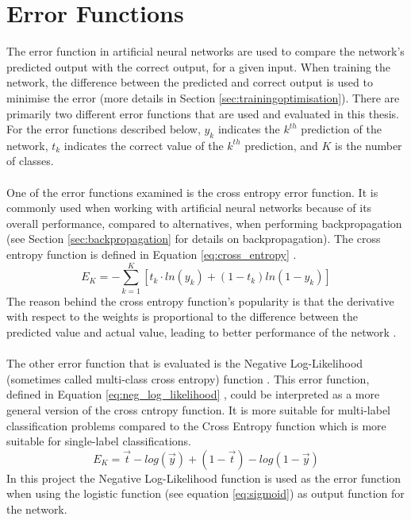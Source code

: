 \section{Error Functions} \label{errorfunction}
The error function in artificial neural networks are used to compare the network's predicted output with the correct output, for a given input. When training the network, the difference between the predicted and correct output is used to minimise the error (more details in Section \ref{sec:trainingoptimisation}). There are primarily two different error functions that are used and evaluated in this thesis. For the error functions described below, $y_k$ indicates the $k^{th}$ prediction of the network, $t_k$ indicates the correct value of the $k^{th}$ prediction, and $K$ is the number of classes.
\\\\
One of the error functions examined is the cross entropy error function. It is commonly used when working with artificial neural networks because of its overall performance, compared to alternatives, when performing backpropagation (see Section \ref{sec:backpropagation} for details on backpropagation). The cross entropy function is defined in Equation \ref{eq:cross_entropy} \parencite{bishop2006crossEn}.
\begin{equation} \label{eq:cross_entropy}
    E_K = -\sum_{k=1}^{K} [t_k \cdot ln(y_k) +(1-t_k)ln(1-y_k) ]
\end{equation}
The reason behind the cross entropy function's popularity is that the derivative with respect to the weights is proportional to the difference between the predicted value and actual value, leading to better performance of the network \parencite{nasr2002cross}.
\\\\
The other error function that is evaluated is the Negative Log-Likelihood (sometimes called multi-class cross entropy) function \parencite{bishop2006pattern}. This error function, defined in Equation \ref{eq:neg_log_likelihood} \parencite{tensorflow2016cross}, could be interpreted as a more general version of the cross cntropy function. It is more suitable for multi-label classification problems compared to the Cross Entropy function which is more suitable for single-label classifications.
\begin{equation} \label{eq:neg_log_likelihood}
    E_K = \vec{t} -log(\vec{y}) + (1-\vec{t}) -log(1-\vec{y})
\end{equation}
In this project the Negative Log-Likelihood function is used as the error function when using the logistic function (see equation \ref{eq:sigmoid}) as output function for the network.

